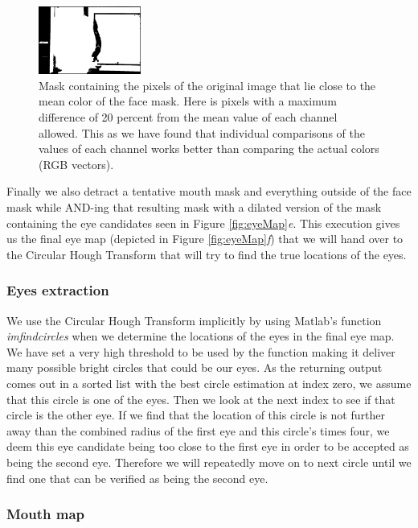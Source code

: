 \begin{figure}[H]
\centering
\includegraphics[width=0.3\textwidth]{img/fd2/averageFaceColorMask.png}
\caption{Mask containing the pixels of the original image that lie close to the mean color of the face mask. Here is pixels with a maximum difference of 20 percent from the mean value of each channel allowed. This as we have found that individual comparisons of the values of each channel works better than comparing the actual colors (RGB vectors).}
\label{fig:averageFaceColorMask}
\end{figure}

Finally we also detract a tentative mouth mask and everything outside of the face mask while AND-ing that resulting mask with a dilated version of the mask containing the eye candidates seen in Figure \ref{fig:eyeMap}\textit{e}. This execution gives us the final eye map (depicted in Figure \ref{fig:eyeMap}\textit{f}) that we will hand over to the Circular Hough Transform that will try to find the true locations of the eyes.

\subsubsection{Eyes extraction}

We use the Circular Hough Transform implicitly by using Matlab's function \textit{imfindcircles} when we determine the locations of the eyes in the final eye map. We have set a very high threshold to be used by the function making it deliver many possible bright circles that could be our eyes. As the returning output comes out in a sorted list with the best circle estimation at index zero, we assume that this circle is one of the eyes. Then we look at the next index to see if that circle is the other eye. If we find that the location of this circle is not further away than the combined radius of the first eye and this circle's times four, we deem this eye candidate being too close to the first eye in order to be accepted as being the second eye. Therefore we will repeatedly move on to next circle until we find one that can be verified as being the second eye.

\subsubsection{Mouth map}


